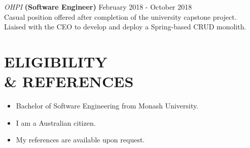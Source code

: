 \documentclass[margin, 11pt]{style}
\begin{document}
\begin{resume}
\vspace{15pt}
{\sl OHPI} \textbf{(Software Engineer)} \hfill February 2018 - October 2018 \\
Casual position offered after completion of the university capstone project. Liaised with the CEO to develop and deploy a Spring-based CRUD monolith.

\section{ELIGIBILITY \\ \& REFERENCES}

\begin{itemize}
\item Bachelor of Software Engineering from Monash University.
\item I am a Australian citizen.
\item My references are available upon request.
\end{itemize}

\end{resume}
\end{document}
